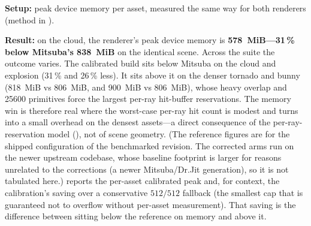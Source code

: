 \textbf{Setup:} peak device memory per asset, measured the same way for both renderers
(method in ).

\textbf{Result:} on the cloud, the renderer's peak device
memory is \textbf{\SI{578}{MiB}---\num{31}\,\% below Mitsuba's \SI{838}{MiB}} on the identical scene.
Across the suite the outcome varies. The calibrated build sits below Mitsuba
on the cloud and explosion (\num{31}\,\% and \num{26}\,\% less). It sits above it on the denser tornado
and bunny (\SI{818}{MiB} vs \SI{806}{MiB}, and \SI{900}{MiB} vs \SI{806}{MiB}), whose heavy overlap and
\num{25600} primitives force the largest per-ray hit-buffer reservations. The memory win is therefore real
where the worst-case per-ray hit count is modest and turns into a small overhead on the densest assets---a
direct consequence of the per-ray-reservation model (), not of scene geometry. (The reference figures are for the shipped configuration of the benchmarked revision. The
corrected arms run on the newer upstream codebase, whose baseline footprint is larger for reasons unrelated to the corrections (a newer
Mitsuba/Dr.Jit generation), so it is not tabulated here.)
 reports the per-asset calibrated peak and, for context, the calibration's saving over a
conservative \(512/512\) fallback (the smallest cap that is guaranteed not to overflow without per-asset
measurement). That saving is the difference between sitting below the reference on memory and above it.

